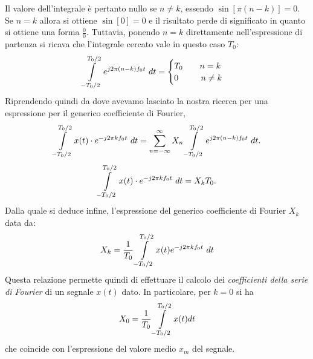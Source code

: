 \documentclass[12pt,oneside,openany]{memoir}
\numberwithin{equation}{subsection}
\newcommand{\dt}{\ dt}
\begin{document}
Il valore dell'integrale \`e pertanto nullo se $n \neq k$, essendo $\sin[\pi (n - k)] = 0$. Se $n = k$ allora si ottiene $\sin[0] = 0$ e il risultato perde di significato in quanto si ottiene una forma $\frac{0}{0}$. Tuttavia, ponendo $n = k$ direttamente nell'espressione di partenza si ricava che l'integrale cercato vale in questo caso $T_0$:
\[
	\int\displaylimits_{-T_0/2}^{T_0/2} e^{j 2 \pi (n - k) f_0 t} \dt =
		\begin{cases}
			T_0 \quad\quad n = k\\
			0 \quad\quad \ \ n \neq k
		\end{cases}
\]
Riprendendo quindi da dove avevamo lasciato la nostra ricerca per una espressione per il generico coefficiente di Fourier,
\[
	\int\displaylimits_{-T_0/2}^{T_0/2} x(t) \cdot e^{-j 2 \pi k f_0 t} \dt = \sum_{n = -\infty}^{\infty} X_n \int\displaylimits_{-T_0/2}^{T_0/2} e^{j 2 \pi (n - k) f_0 t} \dt.
\]
\[
	\int\displaylimits_{-T_0/2}^{T_0/2} x(t) \cdot e^{-j 2 \pi k f_0 t} \dt = X_k T_0.
\]
Dalla quale si deduce infine, l'espressione del generico coefficiente di Fourier $X_k$ data da:
\begin{equation}\label{eq:fourier_coefficient}
	X_k = \frac{1}{T_0} \int\displaylimits_{-T_0/2}^{T_0/2} x(t) e^{-j 2 \pi k f_0 t} \dt
\end{equation}
Questa relazione permette quindi di effettuare il calcolo dei \textit{coefficienti della serie di Fourier} di un segnale $x(t)$ dato. In particolare, per $k = 0$ si ha
\begin{equation}
X_0 = \frac{1}{T_0} \int\displaylimits_{-T_0/2}^{T_0/2} x(t) dt
\end{equation}
che coincide con l'espressione del valore medio $x_m$ del segnale.
\end{document}
